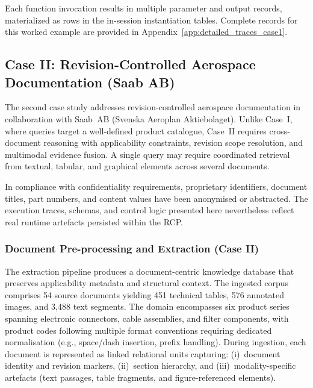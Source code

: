 \documentclass[largeformat]{interact}
\begin{document}
Each function invocation results in multiple parameter and output records, materialized as rows in the in-session instantiation tables. Complete records for this worked example are provided in Appendix~\ref{app:detailed_traces_case1}.


\subsection{Case II: Revision-Controlled Aerospace Documentation (Saab AB)}
\label{subsec:saab_case}
The second case study addresses revision-controlled aerospace documentation in collaboration with Saab~AB (Svenska Aeroplan Aktiebolaget). Unlike Case~I, where queries target a well-defined product catalogue, Case~II requires cross-document reasoning with applicability constraints, revision scope resolution, and multimodal evidence fusion. A single query may require coordinated retrieval from textual, tabular, and graphical elements across several documents.

In compliance with confidentiality requirements, proprietary identifiers, document titles, part numbers, and content values have been anonymised or abstracted. The execution traces, schemas, and control logic presented here nevertheless reflect real runtime artefacts persisted within the RCP.

\subsubsection{Document Pre-processing and Extraction (Case II)}
\label{subsubsec:saab_document_harvesting}
The extraction pipeline produces a document-centric knowledge database that preserves applicability metadata and structural context. The ingested corpus comprises 54 source documents yielding 451 technical tables, 576 annotated images, and 3{,}488 text segments. The domain encompasses six product series spanning electronic connectors, cable assemblies, and filter components, with product codes following multiple format conventions requiring dedicated normalisation (e.g., space/dash insertion, prefix handling). During ingestion, each document is represented as linked relational units capturing: (i)~document identity and revision markers, (ii)~section hierarchy, and (iii)~modality-specific artefacts (text passages, table fragments, and figure-referenced elements).
\end{document}
